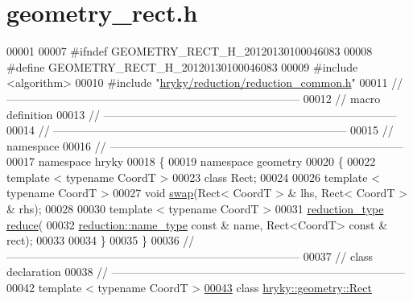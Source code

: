 \hypertarget{geometry__rect_8h_source}{\section{geometry\-\_\-rect.\-h}
}

\begin{DoxyCode}
00001 
00007 \textcolor{preprocessor}{#ifndef GEOMETRY\_RECT\_H\_20120130100046083}
00008 \textcolor{preprocessor}{}\textcolor{preprocessor}{#define GEOMETRY\_RECT\_H\_20120130100046083}
00009 \textcolor{preprocessor}{}\textcolor{preprocessor}{#include <algorithm>}
00010 \textcolor{preprocessor}{#include "\hyperlink{reduction__common_8h}{hryky/reduction/reduction_common.h}"}
00011 \textcolor{comment}{//
      ------------------------------------------------------------------------------}
00012 \textcolor{comment}{// macro definition}
00013 \textcolor{comment}{//
      ------------------------------------------------------------------------------}
00014 \textcolor{comment}{//
      ------------------------------------------------------------------------------}
00015 \textcolor{comment}{// namespace}
00016 \textcolor{comment}{//
      ------------------------------------------------------------------------------}
00017 \textcolor{keyword}{namespace }hryky
00018 \{
00019 \textcolor{keyword}{namespace }geometry
00020 \{
00022     \textcolor{keyword}{template} < \textcolor{keyword}{typename} CoordT >
00023     \textcolor{keyword}{class }Rect;
00024 
00026     \textcolor{keyword}{template} < \textcolor{keyword}{typename} CoordT >
00027     \textcolor{keywordtype}{void} \hyperlink{namespacehryky_1_1geometry_a73028b267b1f3811ebacb86acbee6742}{swap}(Rect< CoordT > & lhs, Rect< CoordT > & rhs);
00028     
00030     \textcolor{keyword}{template} < \textcolor{keyword}{typename} CoordT >
00031     \hyperlink{namespacehryky_a343a9a4c36a586be5c2693156200eadc}{reduction_type} \hyperlink{namespacehryky_1_1geometry_a18354ece30244aa68fc3744f2cdb41fc}{reduce}(
00032         \hyperlink{namespacehryky_1_1reduction_ac686c30a4c8d196bbd0f05629a6b921f}{reduction::name_type} \textcolor{keyword}{const} & name, Rect<CoordT> \textcolor{keyword}{const} & rect);
00033 
00034 \}
00035 \}
00036 \textcolor{comment}{//
      ------------------------------------------------------------------------------}
00037 \textcolor{comment}{// class declaration}
00038 \textcolor{comment}{//
      ------------------------------------------------------------------------------}
00042 \textcolor{comment}{}\textcolor{keyword}{template} < \textcolor{keyword}{typename} CoordT >
\hypertarget{geometry__rect_8h_source_l00043}{}\hyperlink{classhryky_1_1geometry_1_1_rect}{00043} \textcolor{keyword}{class }\hyperlink{classhryky_1_1geometry_1_1_rect}{hryky::geometry::Rect}

\end{DoxyCode}
